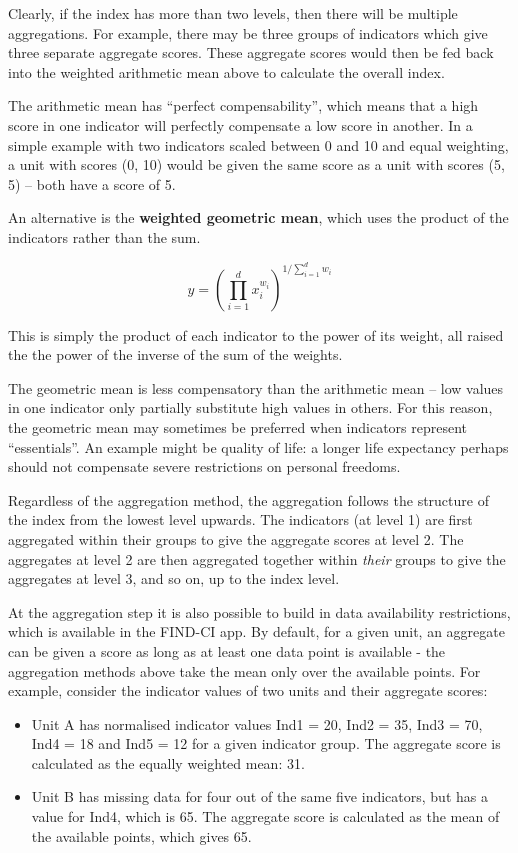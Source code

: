 \documentclass[
  letterpaper,
  DIV=11,
  numbers=noendperiod]{scrreprt}
\providecommand{\tightlist}{%
  \setlength{\itemsep}{0pt}\setlength{\parskip}{0pt}}\usepackage{longtable,booktabs,array}
\begin{document}
Clearly, if the index has more than two levels, then there will be
multiple aggregations. For example, there may be three groups of
indicators which give three separate aggregate scores. These aggregate
scores would then be fed back into the weighted arithmetic mean above to
calculate the overall index.

The arithmetic mean has ``perfect compensability'', which means that a
high score in one indicator will perfectly compensate a low score in
another. In a simple example with two indicators scaled between 0 and 10
and equal weighting, a unit with scores (0, 10) would be given the same
score as a unit with scores (5, 5) -- both have a score of 5.

An alternative is the \textbf{weighted geometric mean}, which uses the
product of the indicators rather than the sum.

\[ y = \left( \prod_{i=1}^d x_i^{w_i} \right)^{1 / \sum_{i=1}^d w_i} \]

This is simply the product of each indicator to the power of its weight,
all raised the the power of the inverse of the sum of the weights.

The geometric mean is less compensatory than the arithmetic mean -- low
values in one indicator only partially substitute high values in others.
For this reason, the geometric mean may sometimes be preferred when
indicators represent ``essentials''. An example might be quality of
life: a longer life expectancy perhaps should not compensate severe
restrictions on personal freedoms.

Regardless of the aggregation method, the aggregation follows the
structure of the index from the lowest level upwards. The indicators (at
level 1) are first aggregated within their groups to give the aggregate
scores at level 2. The aggregates at level 2 are then aggregated
together within \emph{their} groups to give the aggregates at level 3,
and so on, up to the index level.

At the aggregation step it is also possible to build in data
availability restrictions, which is available in the FIND-CI app. By
default, for a given unit, an aggregate can be given a score as long as
at least one data point is available - the aggregation methods above
take the mean only over the available points. For example, consider the
indicator values of two units and their aggregate scores:

\begin{itemize}
\tightlist
\item
  Unit A has normalised indicator values Ind1 = 20, Ind2 = 35, Ind3 =
  70, Ind4 = 18 and Ind5 = 12 for a given indicator group. The aggregate
  score is calculated as the equally weighted mean: 31.
\item
  Unit B has missing data for four out of the same five indicators, but
  has a value for Ind4, which is 65. The aggregate score is calculated
  as the mean of the available points, which gives 65.
\end{itemize}
\end{document}
